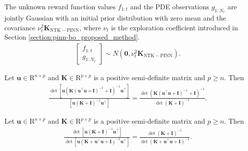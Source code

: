\begin{subcorollary}
\label{corollary:pinn-bo_PINN_GP_func}
    The unknown reward function values $f_{1:t}$ and the PDE observations $g_{1:N_r}$ are jointly Gaussian with an initial prior distribution with zero mean and the covariance $\nu_t^2 \mathbf{K}_\mathrm{NTK-PINN}$, where $\nu_t$ is the exploration coefficient introduced in Section \ref{section:pinn-bo_proposed_method}. 
\begin{align*}
    \begin{bmatrix}
        f_{1:t} \\
        g_{1:N_r}
\end{bmatrix} \sim N(\mathbf{0}, \nu_t^2 \mathbf{K}_\mathrm{NTK-PINN}).
\end{align*} 
\end{subcorollary}

\begin{auxlemma}
    \label{lemma:pinn-bo_det_division}
    Let $\mathbf{u} \in \mathrm{R}^{n \times p}$ and $\mathbf{K} \in \mathrm{R}^{p \times p}$ is a positive semi-definite matrix and $p \ge n$. Then 
    \begin{align*}
    \frac{\det [\mathbf{u}\left(\mathbf{K}(\mathbf{u}^\top\mathbf{u}+\mathbf{I})^{-1} + \mathbf{I}\right)^{-1}\mathbf{u}^\top]}{[\mathbf{u}\left(\mathbf{K} + \mathbf{I}\right)^{-1}\mathbf{u}^\top]} =  \frac{\det \left(\mathbf{K}(\mathbf{u}^\top\mathbf{u}+\mathbf{I})^{-1} + \mathbf{I}\right)^{-1}}{\det \left(\mathbf{K} + \mathbf{I}\right)^{-1}}.   
    \end{align*}
\end{auxlemma}

\begin{subcorollary}
\label{corollary:pinn-bo_det_divison_corollary}
Let $\mathbf{u} \in \mathrm{R}^{n \times p}$ and $\mathbf{K} \in \mathrm{R}^{p \times p}$ is a positive semi-definite matrix and $p \ge n$. Then 
\begin{align*}
    \frac{\det[\mathbf{u}(\mathbf{K}+\mathbf{I})^{-1} \mathbf{u}^\top]}{\det [\mathbf{u}(\mathbf{K}+ \mathbf{u}^\top \mathbf{u} + \mathbf{I})^{-1} \mathbf{u}^\top]} = \frac{\det (\mathbf{K}+\mathbf{I})^{-1}}{\det(\mathbf{K}+\mathbf{u}^\top \mathbf{u}+\mathbf{I})^{-1}}.
\end{align*}
\end{subcorollary}


